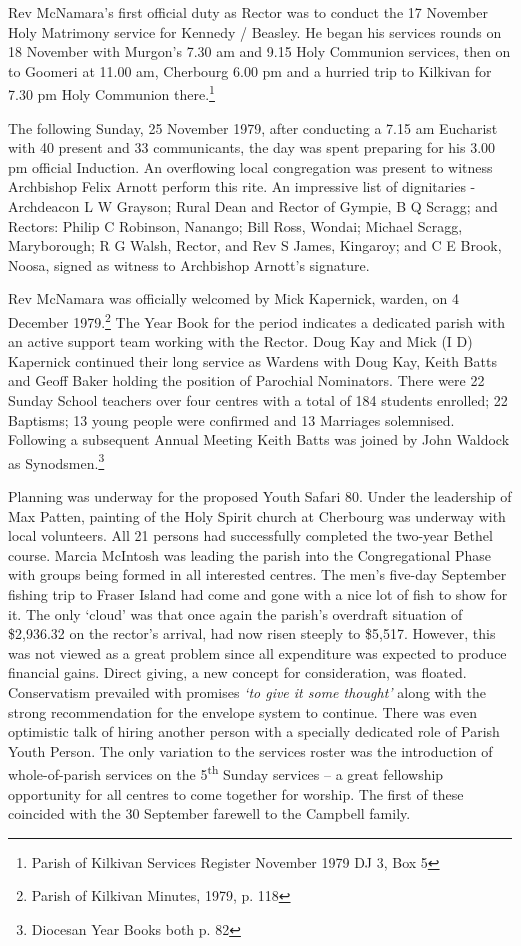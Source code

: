 Rev McNamara's first official duty as Rector was to conduct the 17 November Holy Matrimony service for Kennedy / Beasley. He began his services rounds on 18 November with Murgon's 7.30 am and 9.15 Holy Communion services, then on to Goomeri at 11.00 am, Cherbourg 6.00 pm and a hurried trip to Kilkivan for 7.30 pm Holy Communion there.\footnote{Parish of Kilkivan Services Register November 1979 DJ 3, Box 5}


The following Sunday, 25 November 1979, after conducting a 7.15 am Eucharist with 40 present and 33 communicants, the day was spent preparing for his 3.00 pm official Induction. An overflowing local congregation was present to witness Archbishop Felix Arnott perform this rite. An impressive list of dignitaries - Archdeacon L W Grayson; Rural Dean and Rector of Gympie, B Q Scragg; and Rectors: Philip C Robinson, Nanango; Bill Ross, Wondai; Michael Scragg, Maryborough; R G Walsh, Rector, and Rev S James, Kingaroy; and C E Brook, Noosa, signed as witness to Archbishop Arnott's signature.



Rev McNamara was officially welcomed by Mick Kapernick, warden, on 4 December 1979.\footnote{Parish of Kilkivan Minutes, 1979, p. 118} The Year Book for the period indicates a dedicated parish with an active support team working with the Rector. Doug Kay and Mick (I D) Kapernick continued their long service as Wardens with Doug Kay, Keith Batts and Geoff Baker holding the position of Parochial Nominators. There were 22 Sunday School teachers over four centres with a total of 184 students enrolled; 22 Baptisms; 13 young people were confirmed and 13 Marriages solemnised. Following a subsequent Annual Meeting Keith Batts was joined by John Waldock as Synodsmen.\footnote{Diocesan Year Books both p. 82}


Planning was underway for the proposed Youth Safari 80. Under the leadership of Max Patten, painting of the Holy Spirit church at Cherbourg was underway with local volunteers. All 21 persons had successfully completed the two-year Bethel course. Marcia McIntosh was leading the parish into the Congregational Phase with groups being formed in all interested centres. The men's five-day September fishing trip to Fraser Island had come and gone with a nice lot of fish to show for it. The only `cloud' was that once again the parish's overdraft situation of \$2,936.32 on the rector's arrival, had now risen steeply to \$5,517. However, this was not viewed as a great problem since all expenditure was expected to produce financial gains. Direct giving, a new concept for consideration, was floated. Conservatism prevailed with promises \emph{`to give it some thought'} along with the strong recommendation for the envelope system to continue. There was even optimistic talk of hiring another person with a specially dedicated role of Parish Youth Person. The only variation to the services roster was the introduction of whole-of-parish services on the 5\textsuperscript{th} Sunday services -- a great fellowship opportunity for all centres to come together for worship. The first of these coincided with the 30 September farewell to the Campbell family.



